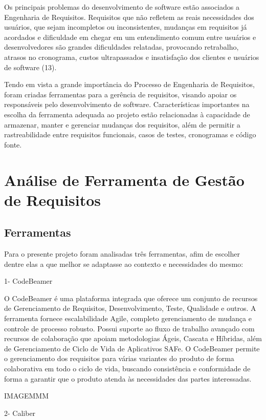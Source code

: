 Os principais problemas do desenvolvimento de software estão associados a Engenharia de Requisitos. Requisitos que não refletem as reais necessidades dos usuários, que sejam incompletos ou inconsistentes, mudanças em requisitos já acordados e dificuldade em chegar em um entendimento comum entre usuários e desenvolvedores são grandes dificuldades relatadas, provocando retrabalho, atrasos no cronograma, custos ultrapassados e insatisfação dos clientes e usuários de software (13).

Tendo em vista a grande importância do Processo de Engenharia de Requisitos, foram criadas ferramentas para a gerência de requisitos, visando apoiar os responsáveis pelo desenvolvimento de software. Características importantes na escolha da ferramenta adequada ao projeto estão relacionadas à capacidade de  armazenar, manter e gerenciar mudanças dos requisitos, além de permitir a rastreabilidade entre requisitos funcionais, casos de testes, cronogramas e código fonte.


\section {Análise de Ferramenta de Gestão de Requisitos}

\subsection{Ferramentas}

Para o presente projeto foram analisadas três ferramentas, afim de escolher dentre elas a que melhor se adaptasse ao contexto e necessidades do mesmo:

1- CodeBeamer

O CodeBeamer é uma plataforma integrada que oferece um conjunto de recursos de Gerenciamento de Requisitos, Desenvolvimento, Teste, Qualidade e outros. A ferramenta fornece escalabilidade Agile, completo gerenciamento de mudança e controle de processo robusto. Possui suporte ao fluxo de trabalho avançado com recursos de colaboração que apoiam metodologias Ágeis, Cascata e Híbridas, além de Gerenciamento de Ciclo de Vida de Aplicativos SAFe. O CodeBeamer permite o gerenciamento dos requisitos para várias variantes do produto de forma colaborativa em todo o ciclo de vida, buscando consistência e conformidade de forma a garantir que o produto atenda às necessidades das partes interessadas.

IMAGEMMM


2- Caliber

